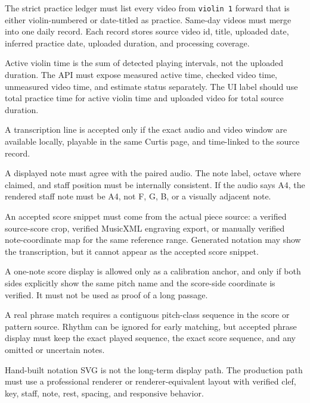 \begin{description}[leftmargin=1.85em,style=nextline]
    \item[Archive gate.] The strict practice ledger must list every video from \texttt{violin 1} forward that is either violin-numbered or date-titled as practice. Same-day videos must merge into one daily record. Each record stores source video id, title, uploaded date, inferred practice date, uploaded duration, and processing coverage.
    \item[Practice-time gate.] Active violin time is the sum of detected playing intervals, not the uploaded duration. The API must expose measured active time, checked video time, unmeasured video time, and estimate status separately. The UI label should use total practice time for active violin time and uploaded video for total source duration.
    \item[Evidence-media gate.] A transcription line is accepted only if the exact audio and video window are available locally, playable in the same Curtis page, and time-linked to the source record.
    \item[Note gate.] A displayed note must agree with the paired audio. The note label, octave where claimed, and staff position must be internally consistent. If the audio says A4, the rendered staff note must be A4, not F, G, B, or a visually adjacent note.
    \item[Score gate.] An accepted score snippet must come from the actual piece source: a verified source-score crop, verified MusicXML engraving export, or manually verified note-coordinate map for the same reference range. Generated notation may show the transcription, but it cannot appear as the accepted score snippet.
    \item[Single-note gate.] A one-note score display is allowed only as a calibration anchor, and only if both sides explicitly show the same pitch name and the score-side coordinate is verified. It must not be used as proof of a long passage.
    \item[Phrase gate.] A real phrase match requires a contiguous pitch-class sequence in the score or pattern source. Rhythm can be ignored for early matching, but accepted phrase display must keep the exact played sequence, the exact score sequence, and any omitted or uncertain notes.
    \item[Notation gate.] Hand-built notation SVG is not the long-term display path. The production path must use a professional renderer or renderer-equivalent layout with verified clef, key, staff, note, rest, spacing, and responsive behavior.

\end{description}
